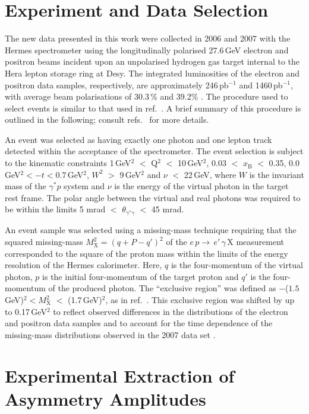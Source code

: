 \section{Experiment and Data Selection}
The new data presented in this work were collected in 2006 and 2007 with the H{\sc ermes}
spectrometer \cite{Ack98} using the longitudinally polarised 27.6\,GeV
electron and positron beams incident upon an unpolarised hydrogen gas
target internal to the H{\sc era} lepton storage ring at D{\sc esy}. The integrated luminosities of the electron and positron data samples, respectively, are
approximately 246\,pb$^{-1}$ and 1460\,pb$^{-1}$, with average beam polarisations of 30.3\,\% and 39.2\% \cite{Ben01}. The procedure used to select events is similar to that used in ref.~\cite{Air09}.
A brief summary of this procedure is outlined in the following; consult
refs.~\cite{Zei09,Bur10} for more details. 

An event
was selected as having exactly one photon and one lepton
track detected within the acceptance of the spectrometer.
The event selection is subject to the kinematic constraints 1\,GeV$^{2}$ $<$
Q$^{2}$ $<$ 10\,GeV$^{2}$, 0.03 $<$ $x_{\textrm{B}}$ $<$ 0.35,
$0.0$\,GeV$^2 < -t < 0.7$\,GeV$^2$, $W^{2}$ $>$
9\,GeV$^{2}$ and $\nu$ $<$ 22\,GeV, where $W$ is the invariant mass of the
$\gamma^{*}p$ system and $\nu$ is the energy of the virtual photon in the target
rest frame. The polar angle between the virtual and real photons was required to
be within the limits 5 mrad $<$
$\theta_{\gamma^{*}\gamma}$ $<$ 45 mrad. 

An event sample was selected using a missing-mass technique requiring
that the squared missing-mass $M_{\textrm{X}}^{2}=(q+P-q')^{2}$
of the $e\,p \rightarrow\, e'\,\gamma\, \textrm{X}$ measurement
corresponded to the square of the proton mass within the limits of the
energy resolution of the H{\sc ermes} calorimeter. Here, $q$ is the four-momentum of the virtual photon, $p$ is the initial four-momentum of the target proton and $q'$ is the four-momentum of the produced photon. The ``exclusive region'' was defined as $-$($1.5$\,GeV)$^{2} < M_{\textrm{X}}^{2}$ $<$ (1.7\,GeV)$^{2}$, as in ref.~\cite{Air09}. This exclusive region was shifted by up to 0.17\,GeV$^{2}$ to reflect observed differences in the distributions of the electron and positron data samples and to account for the time dependence of the missing-mass distributions observed in the 2007 data set \cite{Bur10}. 

\section{Experimental Extraction of Asymmetry Amplitudes}

